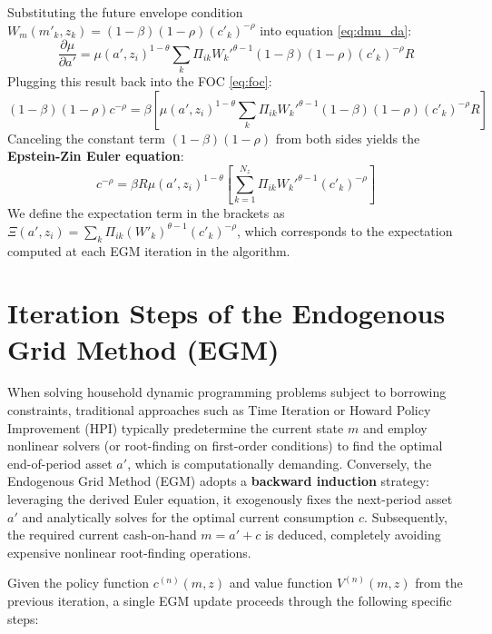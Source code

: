 \documentclass[a4paper,12pt]{article}
\begin{document}
Substituting the future envelope condition $W_m(m'_k, z_k) = (1-\beta)(1-\rho) (c'_k)^{-\rho}$ into equation \eqref{eq:dmu_da}:
\[
    \frac{\partial \mu}{\partial a'} = \mu(a', z_i)^{1-\theta} \sum_{k} \Pi_{ik} {W_k'}^{\theta-1} (1-\beta)(1-\rho) (c'_k)^{-\rho} R
\]
Plugging this result back into the FOC \eqref{eq:foc}:
\[
    (1-\beta)(1-\rho) c^{-\rho} = \beta \left[ \mu(a', z_i)^{1-\theta} \sum_{k} \Pi_{ik} {W_k'}^{\theta-1} (1-\beta)(1-\rho) (c'_k)^{-\rho} R \right]
\]
Canceling the constant term $(1-\beta)(1-\rho)$ from both sides yields the \textbf{Epstein-Zin Euler equation}:
\begin{equation}
    c^{-\rho} = \beta R \mu(a', z_i)^{1-\theta} \left[ \sum_{k=1}^{N_z} \Pi_{ik} {W_k'}^{\theta-1} (c'_k)^{-\rho} \right] \label{eq:euler}
\end{equation}
We define the expectation term in the brackets as $\Xi(a',z_i) = \sum_{k} \Pi_{ik} (W'_k)^{\theta-1} (c'_k)^{-\rho}$, which corresponds to the expectation computed at each EGM iteration in the algorithm.

\section{Iteration Steps of the Endogenous Grid Method (EGM)}

When solving household dynamic programming problems subject to borrowing constraints, traditional approaches such as Time Iteration or Howard Policy Improvement (HPI) typically predetermine the current state $m$ and employ nonlinear solvers (or root-finding on first-order conditions) to find the optimal end-of-period asset $a'$, which is computationally demanding. 
Conversely, the Endogenous Grid Method (EGM) adopts a \textbf{backward induction} strategy: leveraging the derived Euler equation, it exogenously fixes the next-period asset $a'$ and analytically solves for the optimal current consumption $c$. Subsequently, the required current cash-on-hand $m = a' + c$ is deduced, completely avoiding expensive nonlinear root-finding operations.

Given the policy function $c^{(n)}(m,z)$ and value function $V^{(n)}(m,z)$ from the previous iteration, a single EGM update proceeds through the following specific steps:
\end{document}
